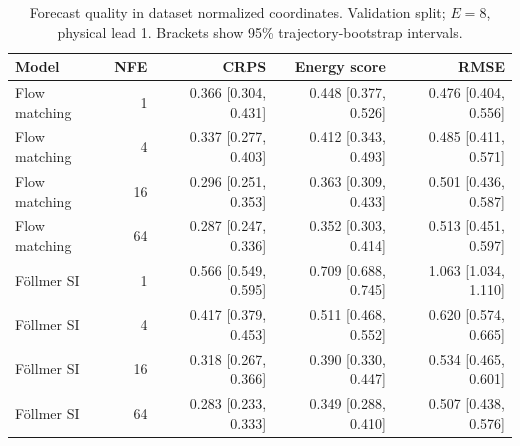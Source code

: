 \begin{table}[t]
\centering
\small
\setlength{\tabcolsep}{3pt}
\caption{Forecast quality in dataset normalized coordinates. Validation split; $E=8$, physical lead 1. Brackets show 95\% trajectory-bootstrap intervals.}
\label{tab:map-quality}
\begin{tabular}{lrrrr}
\toprule
Model & NFE & CRPS & Energy score & RMSE \\
\midrule
Flow matching & 1 & 0.366 [0.304, 0.431] & 0.448 [0.377, 0.526] & 0.476 [0.404, 0.556] \\
Flow matching & 4 & 0.337 [0.277, 0.403] & 0.412 [0.343, 0.493] & 0.485 [0.411, 0.571] \\
Flow matching & 16 & 0.296 [0.251, 0.353] & 0.363 [0.309, 0.433] & 0.501 [0.436, 0.587] \\
Flow matching & 64 & 0.287 [0.247, 0.336] & 0.352 [0.303, 0.414] & 0.513 [0.451, 0.597] \\
\addlinespace
Föllmer SI & 1 & 0.566 [0.549, 0.595] & 0.709 [0.688, 0.745] & 1.063 [1.034, 1.110] \\
Föllmer SI & 4 & 0.417 [0.379, 0.453] & 0.511 [0.468, 0.552] & 0.620 [0.574, 0.665] \\
Föllmer SI & 16 & 0.318 [0.267, 0.366] & 0.390 [0.330, 0.447] & 0.534 [0.465, 0.601] \\
Föllmer SI & 64 & 0.283 [0.233, 0.333] & 0.349 [0.288, 0.410] & 0.507 [0.438, 0.576] \\
\bottomrule
\end{tabular}
\end{table}
